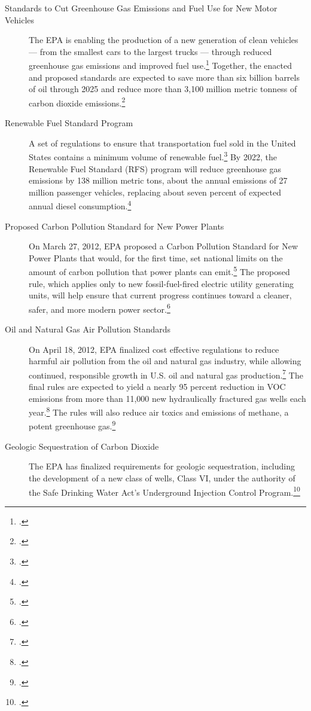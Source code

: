 \begin{description}
	\item [Standards to Cut Greenhouse Gas Emissions and Fuel Use for New Motor Vehicles] The EPA is enabling the production of a new generation of clean vehicles --- from the smallest cars to the largest trucks --- through reduced greenhouse gas emissions and improved fuel use.\footcite[][]{EPAinitiatives} Together, the enacted and proposed standards are expected to save more than six billion barrels of oil through 2025 and reduce more than 3,100 million metric tonness of carbon dioxide emissions.\footcite[][]{EPAinitiatives}
	\item [Renewable Fuel Standard Program] A set of regulations to ensure that transportation fuel sold in the United States contains a minimum volume of renewable fuel.\footcite[][]{EPAinitiatives} By 2022, the Renewable Fuel Standard (RFS) program will reduce greenhouse gas emissions by 138 million metric tons, about the annual emissions of 27 million passenger vehicles, replacing about seven percent of expected annual diesel consumption.\footcite[][]{EPAinitiatives}
	\item [Proposed Carbon Pollution Standard for New Power Plants] On March 27, 2012, EPA proposed a Carbon Pollution Standard for New Power Plants that would, for the first time, set national limits on the amount of carbon pollution that power plants can emit.\footcite[][]{EPAinitiatives} The proposed rule, which applies only to new fossil-fuel-fired electric utility generating units, will help ensure that current progress continues toward a cleaner, safer, and more modern power sector.\footcite[][]{EPAinitiatives}
	\item [Oil and Natural Gas Air Pollution Standards] On April 18, 2012, EPA finalized cost effective regulations to reduce harmful air pollution from the oil and natural gas industry, while allowing continued, responsible growth in U.S. oil and natural gas production.\footcite[][]{EPAinitiatives} The final rules are expected to yield a nearly 95 percent reduction in VOC emissions from more than 11,000 new hydraulically fractured gas wells each year.\footcite[][]{EPAinitiatives} The rules will also reduce air toxics and emissions of methane, a potent greenhouse gas.\footcite[][]{EPAinitiatives}
	\item [Geologic Sequestration of Carbon Dioxide] The EPA has finalized requirements for geologic sequestration, including the development of a new class of wells, Class VI, under the authority of the Safe Drinking Water Act's Underground Injection Control Program.\footcite[][]{EPAinitiatives}
\end{description}



